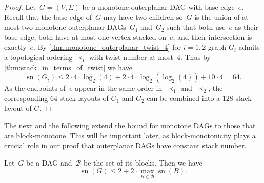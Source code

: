 \documentclass{theoretics}
\DeclareMathOperator{\sn}{sn}
\newcommand{\calB}{\ensuremath{\mathcal{B}}\xspace}
\begin{document}
\begin{proof}
    Let~$G = (V,E)$ be a monotone outerplanar DAG with base edge~$e$.
    Recall that the base edge of~$G$ may have two children so~$ G $ is the union of at most two monotone outerplanar DAGs~$G_1$ and~$G_2$ such that both use~$e$ as their base edge, both have at most one vertex stacked on~$e$, and their intersection is exactly~$e$.
    By \cref{thm:monotone_outerplanar_twist_4} for $i=1,2$ graph $G_i$ admits a topological ordering $\prec_i$ with twist number at most~$4$.
    Thus by \cref{thm:stack_in_terms_of_twist} we have
    \[
        \sn(G_i) \leq 2\cdot 4 \cdot \log_2(4) + 2\cdot 4 \cdot \log_2(\log_2(4)) + 10\cdot 4 = 64.
    \]
    As the endpoints of~$e$ appear in the same order in~$\prec_1$ and~$\prec_2$, the corresponding $64$-stack layouts of $G_1$ and $G_2$ can be combined into a $128$-stack layout of $G$.
\end{proof}

The next  and the following  extend the bound for monotone DAGs to those that are block-monotone.
This will be important later, as block-monotonicity plays a crucial role in our proof that outerplanar DAGs have constant stack number.

\begin{lemma}
    \label{lem:bounded_by_blocks}
    Let~$G$ be a DAG and~$\calB$ be the set of its blocks.
    Then we have
    \[
        \sn(G) \leq 2 + 2 \cdot \max\limits_{B \in \calB} \sn(B)
        \text{.}
    \]
\end{lemma}
\end{document}
